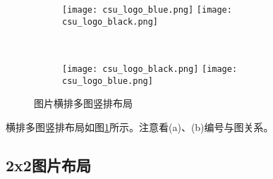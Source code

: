 \begin{figure}[!htb]
    \centering
    \begin{subfigure}[t]{0.3\linewidth}
        \captionsetup{justification=centering} 
        \begin{minipage}[b]{1\linewidth}
        \texttt{[image: csu\_logo\_blue.png]}
        \texttt{[image: csu\_logo\_black.png]}
        \caption{}
        \end{minipage}
    \end{subfigure}\\
    \begin{subfigure}[t]{0.3\linewidth}
        \captionsetup{justification=centering} 
        \begin{minipage}[b]{1\linewidth}
        \texttt{[image: csu\_logo\_black.png]}
        \texttt{[image: csu\_logo\_blue.png]}
        \caption{}
        \end{minipage}
    \end{subfigure}
    \caption{图片横排多图竖排布局}
    \label{f.csu_row_col}
\end{figure}

横排多图竖排布局如图\ref{f.csu_row_col}所示。注意看(a)、(b)编号与图关系。

\subsection{2x2图片布局}

